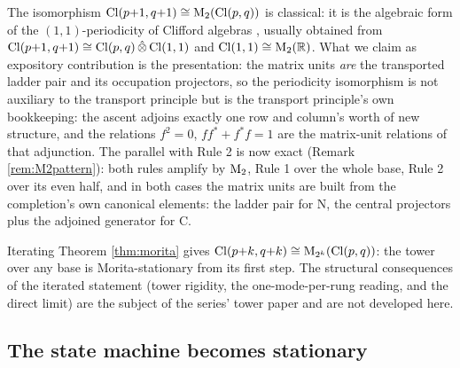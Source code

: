 \begin{remark}\label{rem:moritapriorart}
The isomorphism $\mathrm{Cl}(p{+}1,q{+}1) \cong \mathrm{M}_2(\mathrm{Cl}(p,q))$ is classical: it is the algebraic form of the $(1,1)$-periodicity of Clifford algebras \cite{ABS1964, Porteous1995, Lounesto2001}, usually obtained from $\mathrm{Cl}(p{+}1,q{+}1) \cong \mathrm{Cl}(p,q)\,\hat{\otimes}\,\mathrm{Cl}(1,1)$ and $\mathrm{Cl}(1,1) \cong \mathrm{M}_2(\mathbb{R})$. What we claim as expository contribution is the presentation: the matrix units \emph{are} the transported ladder pair and its occupation projectors, so the periodicity isomorphism is not auxiliary to the transport principle but is the transport principle's own bookkeeping: the ascent adjoins exactly one row and column's worth of new structure, and the relations $f^2 = 0$, $ff^* + f^*f = 1$ are the matrix-unit relations of that adjunction. The parallel with Rule 2 is now exact (Remark \ref{rem:M2pattern}): both rules amplify by $\mathrm{M}_2$, Rule 1 over the whole base, Rule 2 over its even half, and in both cases the matrix units are built from the completion's own canonical elements: the ladder pair for N, the central projectors plus the adjoined generator for C.
\end{remark}

\begin{remark}[Iteration]\label{rem:iteration}
Iterating Theorem \ref{thm:morita} gives $\mathrm{Cl}(p{+}k, q{+}k) \cong \mathrm{M}_{2^k}(\mathrm{Cl}(p,q))$: the tower over any base is Morita-stationary from its first step. The structural consequences of the iterated statement (tower rigidity, the one-mode-per-rung reading, and the direct limit) are the subject of the series' tower paper \cite{ButlerT3} and are not developed here.
\end{remark}

\subsection{The state machine becomes stationary}\label{subsec:parks}

